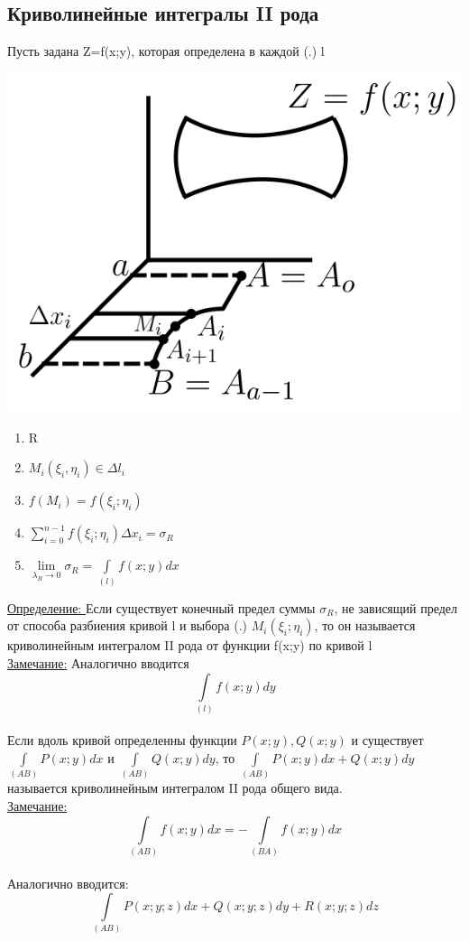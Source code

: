\documentclass[12pt]{article}
\let\ORIincludegraphics\includegraphics
\renewcommand{\includegraphics}[2][]{\ORIincludegraphics[scale=0.65,#1]{#2}}
\let\oldint\int
\let\oldsum\sum
\let\oldlim\lim
\renewcommand{\int}{\oldint\limits}
\renewcommand{\sum}{\oldsum\limits}
\renewcommand{\lim}{\oldlim\limits}
\begin{document}
  \subsection{Криволинейные интегралы II рода}
  Пусть задана Z=f(x;y), которая определена в каждой (.) l\\
  \begin{minipage}{0.45\textwidth}
    \includegraphics[scale=0.8]{8.3.1.png}
  \end{minipage}
  \hspace{1em}
  \begin{minipage}{0.65\textwidth}
    \begin{enumerate}
      \item R
      \item $M_i(\xi_i,\eta_i) \in \Delta l_i$
      \item $f(M_i)=f(\xi_i;\eta_i)$
      \item $\sum_{i=0}^{n-1}f(\xi_i;\eta_i)\Delta x_i=\sigma_R$
      \item $\lim_{\lambda_R \to 0}\sigma_R=\int_{(l)}f(x;y)dx$
    \end{enumerate}
  \end{minipage}
  \vspace{1em}
  \par
  \underline{Определение: } Если существует конечный предел суммы $\sigma_R$, не зависящий предел от способа
  разбиения кривой l и выбора (.) $M_i(\xi_i;\eta_i)$, то он называется криволинейным интегралом
  II рода от функции f(x;y) по кривой l\\
  \underline{Замечание:} Аналогично вводится\\
  \[\int_{(l)}f(x;y)dy\]\\
  Если вдоль кривой определенны функции $P(x;y),Q(x;y)$ и существует $\int_{(AB)}P(x;y)dx$ и
  $\int_{(AB)}Q(x;y)dy$, то $\int_{(AB)}P(x;y)dx+Q(x;y)dy$ называется криволинейным интегралом
  II рода общего вида.\\
  \underline{Замечание:} \[\int_{(AB)}f(x;y)dx=-\int_{(BA)}f(x;y)dx\]\\
  Аналогично вводится: \[\int_{(AB)}P(x;y;z)dx+Q(x;y;z)dy+R(x;y;z)dz\]
\end{document}
